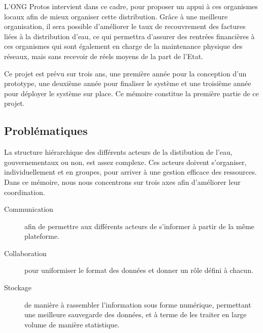 \documentclass{eplmastersthesis_FR}
\begin{document}
			L'ONG Protos intervient dans ce cadre, pour proposer un appui à ces organismes locaux afin de mieux organiser cette distribution. Grâce à une meilleure organisation, il sera possible d'améliorer le taux de recouvrement des factures liées à la distribution d'eau, ce qui permettra d'assurer des rentrées financières à ces organismes qui sont également en charge de la maintenance physique des réseaux, mais sans recevoir de réels moyens de la part de l'Etat.

			Ce projet est prévu sur trois ans, une première année pour la conception d'un prototype, une deuxième année pour finaliser le système et une troisième année pour déployer le système sur place. Ce mémoire constitue la première partie de ce projet.


		\subsection*{Problématiques}

			La structure hiérarchique des différents acteurs de la distibution de l'eau, gouvernementaux ou non, est assez complexe. Ces acteurs doivent s'organiser, individuellement et en groupes, pour arriver à une gestion efficace des ressources. Dans ce mémoire, nous nous concentrons sur trois axes afin d'améliorer leur coordination.

			\begin{description}
				\item[Communication] afin de permettre aux différents acteurs de s'informer à partir de la même plateforme.
				\item[Collaboration] pour uniformiser le format des données et donner un rôle défini à chacun.
				\item[Stockage] de manière à rassembler l'information sous forme numérique, permettant une meilleure sauvegarde des données, et à terme de les traiter en large volume de manière statistique.
			\end{description}

\end{document}
